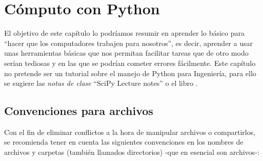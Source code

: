 \chapter{Cómputo con Python}
\graphicspath{{img/herramientas/}}

El objetivo de este capítulo lo podríamos resumir en aprender lo básico para ``hacer que los computadores trabajen para nosotros'', es decir, aprender a usar unas herramientas básicas que nos permitan facilitar tareas que de otro modo serían tediosas y en las que se podrían cometer errores fácilmente. Este capítulo no pretende ser un tutorial sobre el manejo de Python para Ingeniería, para ello se sugiere las \emph{notas de clase} ``SciPy Lecture notes'' \cite{scipy-lectures} o el libro \cite{book:programming_computations}.

\section{Convenciones para archivos}

Con el fin de eliminar conflictos a la hora de manipular archivos o compartirlos, se recomienda tener en cuenta las siguientes convenciones en los nombres
de archivos y carpetas (también llamados directorios) -que en esencial son archivos-:

